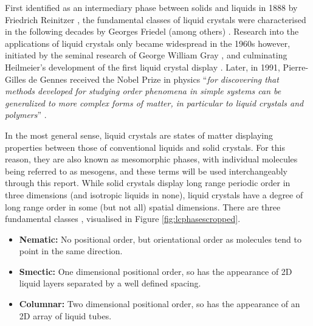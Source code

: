 \documentclass[11pt, a4paper]{article} %
\begin{document}
First identified as an intermediary phase between solids and liquids in 1888 by Friedrich Reinitzer \cite{Reinitzer1888}, the fundamental classes of liquid crystals were characterised in the following decades by Georges Friedel (among others) \cite{Friedel1922}. Research into the applications of liquid crystals only became widespread in the 1960s however, initiated by the seminal research of George William Gray \cite{Gray1962}, and culminating Heilmeier's development of the first liquid crystal display \cite{Heilmeier1969, Heilmeier1968}. Later, in 1991, Pierre-Gilles de Gennes  received the Nobel Prize in physics ``\textit{for discovering that methods developed for studying order phenomena in simple systems can be generalized to more complex forms of matter, in particular to liquid crystals and polymers}'' \cite{DeGennes1992}.

In the most general sense, liquid crystals are states of matter displaying properties between those of conventional liquids and solid crystals. For this reason, they are also known as mesomorphic phases, with individual molecules being referred to as mesogens, and these terms will be used interchangeably through this report. While solid crystals display long range periodic order in three dimensions (and isotropic liquids in none), liquid crystals have a degree of long range order in some (but not all) spatial dimensions. There are three fundamental classes \cite{DeGennes1993}, visualised in Figure \ref{fig:lcphasescropped}.

\begin{itemize}
	\item \textbf{Nematic:} No positional order, but orientational order as molecules tend to point in the same direction.
	\item \textbf{Smectic:} One dimensional positional order, so has the appearance of 2D liquid layers separated by a well defined spacing.
	\item \textbf{Columnar:} Two dimensional positional order, so has the appearance of an 2D array of liquid tubes.
\end{itemize}

\end{document}
